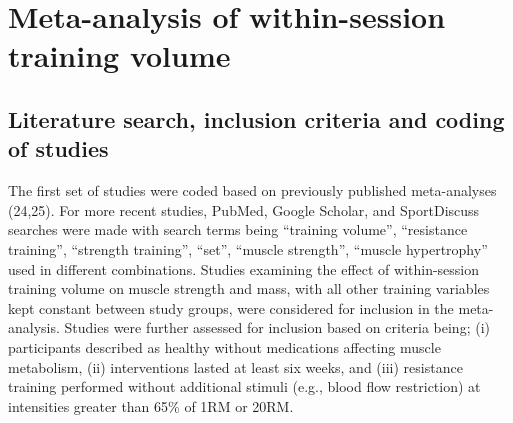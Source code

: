 \documentclass[twoside,10pt]{gihclass} %
\begin{document}
\hypertarget{meta-analysis-of-within-session-training-volume}{%
\section{Meta-analysis of within-session training volume}\label{meta-analysis-of-within-session-training-volume}}

\hypertarget{literature-search-inclusion-criteria-and-coding-of-studies}{%
\subsection{Literature search, inclusion criteria and coding of studies}\label{literature-search-inclusion-criteria-and-coding-of-studies}}

The first set of studies were coded based on previously published
meta-analyses (24,25). For more recent studies, PubMed, Google Scholar, and SportDiscuss searches were made with search terms being ``training volume'', ``resistance training'', ``strength training'', ``set'',
``muscle strength'', ``muscle hypertrophy'' used in different combinations. Studies examining the effect of within-session training volume on muscle strength and mass, with all other training variables kept constant between study groups, were considered for inclusion in the meta-analysis.
Studies were further assessed for inclusion based on criteria being; (i) participants described as healthy without medications affecting muscle
metabolism, (ii) interventions lasted at least six weeks, and (iii) resistance training performed without additional stimuli (e.g., blood flow restriction) at intensities greater than 65\% of 1RM or 20RM.
\end{document}
